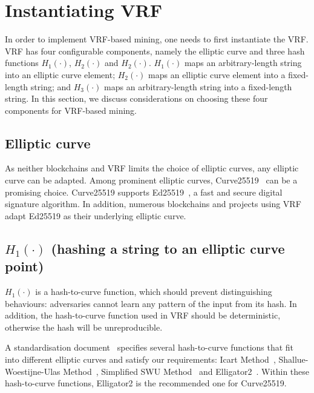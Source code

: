 \section{Instantiating VRF}

In order to implement VRF-based mining, one needs to first instantiate the VRF.
VRF has four configurable components, namely the elliptic curve and three hash functions $H_{1}(\cdot)$, $H_{2}(\cdot)$ and $H_{2}(\cdot)$.
$H_{1}(\cdot)$ maps an arbitrary-length string into an elliptic curve element;
$H_{2}(\cdot)$ maps an elliptic curve element into a fixed-length string; and
$H_{3}(\cdot)$ maps an arbitrary-length string into a fixed-length string.
In this section, we discuss considerations on choosing these four components for VRF-based mining.





\subsection{Elliptic curve}

As neither blockchains and VRF limits the choice of elliptic curves, any elliptic curve can be adapted.
Among prominent elliptic curves, Curve25519~\cite{bernstein2006curve25519} can be a promising choice.
Curve25519 supports Ed25519~\cite{bernstein2012high}, a fast and secure digital signature algorithm.
In addition, numerous blockchains and projects using VRF adapt Ed25519 as their underlying elliptic curve.




\subsection{$H_{1}(\cdot)$ (hashing a string to an elliptic curve point)}

$H_{1}(\cdot)$ is a hash-to-curve function, which should prevent distinguishing behaviours: adversaries cannot learn any pattern of the input from its hash.
In addition, the hash-to-curve function used in VRF should be deterministic, otherwise the hash will be unreproducible.

A standardisation document~\cite{scott2019hashing} specifies several hash-to-curve functions that fit into different elliptic curves and satisfy our requirements: Icart Method~\cite{icart2009hash}, Shallue-Woestijne-Ulas Method~\cite{ulas2007rational}, Simplified SWU Method~\cite{brier2010efficient} and Elligator2~\cite{bernstein2013elligator}.
Within these hash-to-curve functions, Elligator2 is the recommended one for Curve25519.





